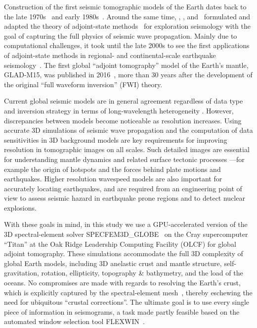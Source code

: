 Construction of the first seismic tomographic models of the Earth dates back to the late 1970s~\cite{Aki77,Dziewonski77,SenTok77} and early 1980s~\cite{WD84, Nataf1984}.
Around the same time,
\cite{BaChLa77}, \cite{Lailly1983}, and~\cite{Tar84} formulated and adapted the theory of adjoint-state methods~\cite{Chavent1974} for exploration seismology with the goal of capturing the full physics of seismic wave propagation.
Mainly due to computational challenges,
it took until the late 2000s to see the first applications of adjoint-state methods in regional- and continental-scale earthquake seismology~\cite{tape2009adjoint,Fichtner09,zhu2012structure}.
The first global ``adjoint tomography'' model of the Earth's mantle,
GLAD-M15, was published in 2016~\cite{bozdaug2016global}, more than 30 years after the development of the original ``full waveform inversion'' (FWI) theory.

Current global seismic models are in general agreement regardless of data type and inversion strategy in terms of long-wavelength heterogeneity \cite{ritzwollerlavely1995,TW01,beckerboschi2002}.
However, discrepancies between models become noticeable as resolution increases.
Using accurate 3D simulations of seismic wave propagation and the computation of data sensitivities in 3D background models are key requirements for improving resolution in tomographic images on all scales.
Such detailed images are essential for understanding mantle dynamics and related surface tectonic processes
---for example the origin of hotspots and the forces behind plate motions and earthquakes.
Higher resolution wavespeed models are also important for accurately locating earthquakes, and are required from an engineering point of view to assess seismic hazard in earthquake prone regions and to detect nuclear explosions. 

With these goals in mind,
in this study we use a GPU-accelerated version of the 3D spectral-element solver
SPECFEM3D\_GLOBE~\cite{KoTr02a,KoTr02b} on the Cray supercomputer ``Titan'' at the Oak Ridge Leadership Computing Facility (OLCF) for global adjoint tomography.
These simulations accommodate the full 3D complexity of global Earth models,
including 3D anelastic crust and mantle structure, self-gravitation, rotation, ellipticity, topography \& bathymetry, and the load of the oceans.
No compromises are made with regards to resolving the Earth's crust,
which is explicitly captured by the spectral-element mesh~\cite{tromp2010a},
thereby eschewing the need for ubiquitous ``crustal corrections''.
The ultimate goal is to use every single piece of information in seismograms,
a task made partly feasible based on the automated window selection tool FLEXWIN~\cite{maggi2009automated}.

